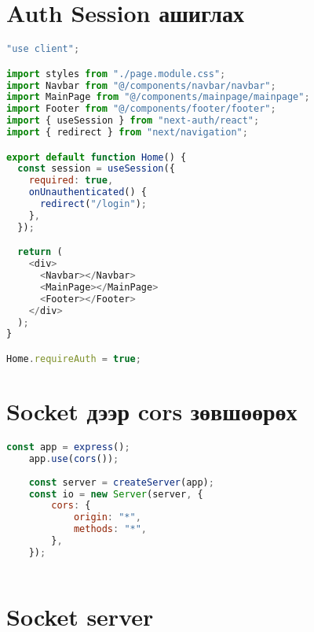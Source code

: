 \chapter{Auth Session ашиглах}
\label{appendix:session-provider-usage}

\begin{lstlisting}[language=Javascript, frame=single]
	"use client";

import styles from "./page.module.css";
import Navbar from "@/components/navbar/navbar";
import MainPage from "@/components/mainpage/mainpage";
import Footer from "@/components/footer/footer";
import { useSession } from "next-auth/react";
import { redirect } from "next/navigation";

export default function Home() {
  const session = useSession({
    required: true,
    onUnauthenticated() {
      redirect("/login");
    },
  });

  return (
    <div>
      <Navbar></Navbar>
      <MainPage></MainPage>
      <Footer></Footer>
    </div>
  );
}

Home.requireAuth = true;

\end{lstlisting}

\chapter{Socket дээр cors зөвшөөрөх}
\label{appendix:socket-cors-config}

\begin{lstlisting}[language=Javascript, frame=single]
	const app = express();
	app.use(cors());
	
	const server = createServer(app);
	const io = new Server(server, {
		cors: {
			origin: "*",
			methods: "*",
		},
	});
	
\end{lstlisting}


\chapter{Socket server}
\label{appendix:socket-server}


